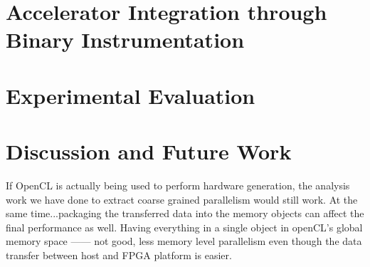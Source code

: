 \section{Accelerator Integration through Binary Instrumentation}
\newpage

\section{Experimental Evaluation }
\label{biev}






\section{Discussion and Future Work}
If OpenCL is actually being used to perform hardware generation, the analysis work we have done to extract coarse grained parallelism would still work.
At the same time...packaging the transferred data into the memory objects can affect the final performance as well. Having everything in a single 
object in openCL's global memory space ------ not good, less memory level parallelism even though the data transfer between host and FPGA platform
is easier. 





